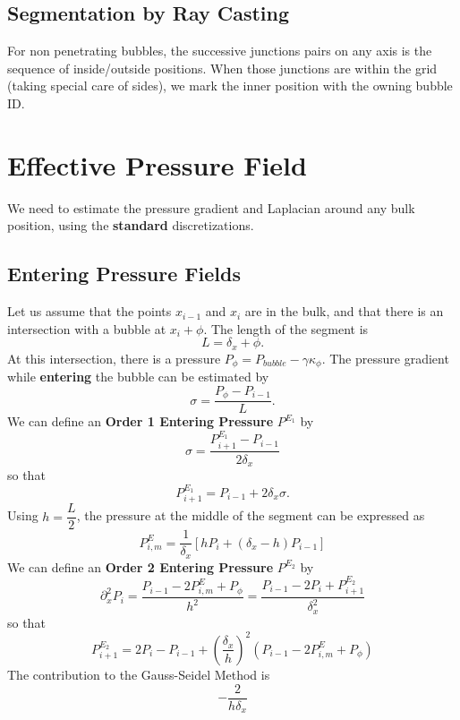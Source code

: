 \documentclass[aps]{revtex4}
\begin{document}
\subsection{Segmentation by Ray Casting}
For non penetrating bubbles, the successive junctions pairs on any axis is the sequence of inside/outside positions.
When those junctions are within the grid (taking special care of sides), we mark the inner position with the owning bubble ID.

\section{Effective Pressure Field}
We need to estimate the pressure gradient and Laplacian around any bulk position,
using the \textbf{standard} discretizations.

\subsection{Entering Pressure Fields}
Let us assume that the points $x_{i-1}$ and $x_i$ are in the bulk, and that there is
an intersection with a bubble at $x_i+\phi$.
The length of the segment
is
$$
	L = \delta_x + \phi.
$$ 
At this intersection, there is a pressure $P_\phi = P_{bubble} - \gamma \kappa_\phi$.
The pressure gradient while \textbf{entering} the bubble can be estimated by
$$
	\sigma = \dfrac{P_\phi - P_{i-1}}{L}.
$$
We can define an \textbf{Order 1 Entering Pressure} $P^{E_1}$ by
$$
	\sigma = \dfrac{P^{E_1}_{i+1}-P_{i-1}}{2\delta_x} 
$$
so that
$$
	P^{E_1}_{i+1} = P_{i-1} + 2\delta_x\sigma.
$$
Using $h= \dfrac{L}{2}$, the pressure at the middle of the segment can be expressed as
$$
	P_{i,m}^E = \dfrac{1}{\delta_x} \left\lbrack
	h P_i + \left(\delta_x - h\right) P_{i-1}
	\right\rbrack
$$
We can define an \textbf{Order 2 Entering Pressure} $P^{E_2}$ by
$$
	\partial_x^2 P_i = \dfrac{P_{i-1} - 2P_{i,m}^E + P_\phi}{{h}^2} = \dfrac{P_{i-1}- 2P_i + P_{i+1}^{{E_2}}}{\delta_x^2}
$$
so that
$$
	P_{i+1}^{{E_2}} = 2P_i - P_{i-1} + \left(\dfrac{\delta_x}{h}\right)^2
	\left(
		P_{i-1} - 2P_{i,m}^E + P_\phi
	\right)
$$
The contribution to the Gauss-Seidel Method is
$$
	-\dfrac{2}{h\delta_x}
$$
\end{document}
